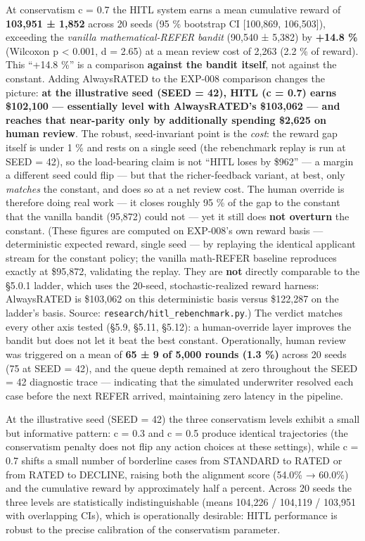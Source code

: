 At conservatism c = 0.7 the HITL system earns a mean cumulative reward of \textbf{103,951 ± 1,852} across 20 seeds (95 \% bootstrap CI {[}100,869, 106,503{]}), exceeding the \emph{vanilla mathematical-REFER bandit} (90,540 ± 5,382) by \textbf{+14.8 \%} (Wilcoxon p \textless{} 0.001, d = 2.65) at a mean review cost of 2,263 (2.2 \% of reward). This ``+14.8 \%'' is a comparison \textbf{against the bandit itself}, not against the constant. Adding AlwaysRATED to the EXP-008 comparison changes the picture: \textbf{at the illustrative seed (SEED = 42), HITL (c = 0.7) earns \$102,100 --- essentially level with AlwaysRATED's \$103,062 --- and reaches that near-parity only by additionally spending \$2,625 on human review}. The robust, seed-invariant point is the \emph{cost}: the reward gap itself is under 1 \% and rests on a single seed (the rebenchmark replay is run at SEED = 42), so the load-bearing claim is not ``HITL loses by \$962'' --- a margin a different seed could flip --- but that the richer-feedback variant, at best, only \emph{matches} the constant, and does so at a net review cost. The human override is therefore doing real work --- it closes roughly 95 \% of the gap to the constant that the vanilla bandit (95,872) could not --- yet it still does \textbf{not overturn} the constant. (These figures are computed on EXP-008's own reward basis --- deterministic expected reward, single seed --- by replaying the identical applicant stream for the constant policy; the vanilla math-REFER baseline reproduces exactly at \$95,872, validating the replay. They are \textbf{not} directly comparable to the §5.0.1 ladder, which uses the 20-seed, stochastic-realized reward harness: AlwaysRATED is \$103,062 on this deterministic basis versus \$122,287 on the ladder's basis. Source: \texttt{research/hitl\_rebenchmark.py}.) The verdict matches every other axis tested (§5.9, §5.11, §5.12): a human-override layer improves the bandit but does not let it beat the best constant. Operationally, human review was triggered on a mean of \textbf{65 ± 9 of 5,000 rounds (1.3 \%)} across 20 seeds (75 at SEED = 42), and the queue depth remained at zero throughout the SEED = 42 diagnostic trace --- indicating that the simulated underwriter resolved each case before the next REFER arrived, maintaining zero latency in the pipeline.

At the illustrative seed (SEED = 42) the three conservatism levels exhibit a small but informative pattern: c = 0.3 and c = 0.5 produce identical trajectories (the conservatism penalty does not flip any action choices at these settings), while c = 0.7 shifts a small number of borderline cases from STANDARD to RATED or from RATED to DECLINE, raising both the alignment score (54.0\% → 60.0\%) and the cumulative reward by approximately half a percent. Across 20 seeds the three levels are statistically indistinguishable (means 104,226 / 104,119 / 103,951 with overlapping CIs), which is operationally desirable: HITL performance is robust to the precise calibration of the conservatism parameter.


